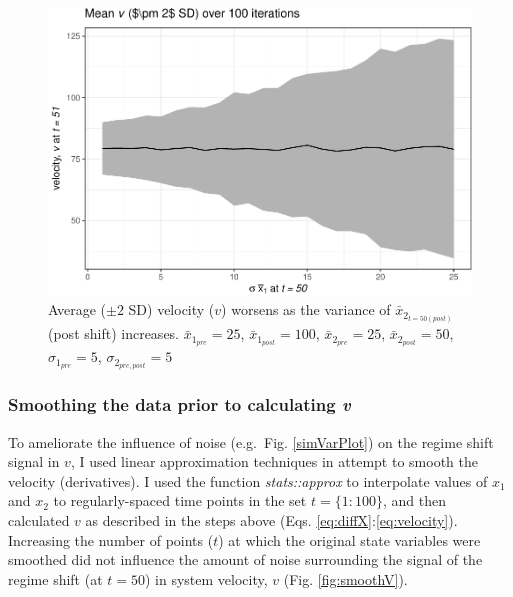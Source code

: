 \documentclass[12pt,twoside,openany]{reedthesis}
\begin{document}
\begin{figure}
\centering
\includegraphics{_myDissertation_files/figure-latex/simVarPlot2-1.pdf}
\caption{\label{fig:simVarPlot2}Average (\(\pm 2\) SD) velocity (\(v\)) worsens as the variance of \(\bar{x}_{2_{t=50 (post)}}\) (post shift) increases. \(\bar{x}_{1_{pre}} = 25\), \(\bar{x}_{1_{post}} = 100\), \(\bar{x}_{2_{pre}} = 25\), \(\bar{x}_{2_{post}} = 50\), \(\sigma_{1_{pre}} = 5\), \(\sigma_{2_{pre,post}} = 5\)}
\end{figure}
\hypertarget{smoothing-the-data-prior-to-calculating-v}{%
\subsubsection{\texorpdfstring{Smoothing the data prior to calculating \emph{v}}{Smoothing the data prior to calculating v}}\label{smoothing-the-data-prior-to-calculating-v}}

To ameliorate the influence of noise (e.g.~Fig. \ref{simVarPlot}) on the regime shift signal in \(v\), I used linear approximation techniques in attempt to smooth the velocity (derivatives). I used the function \emph{stats::approx} to interpolate values of \(x_1\) and \(x_2\) to regularly-spaced time points in the set \(t=\{1:100\}\), and then calculated \(v\) as described in the steps above (Eqs. \eqref{eq:diffX}:\eqref{eq:velocity}). Increasing the number of points (\(t\)) at which the original state variables were smoothed did not influence the amount of noise surrounding the signal of the regime shift (at \(t=50\)) in system velocity, \(v\) (Fig. \ref{fig:smoothV}).
\end{document}
